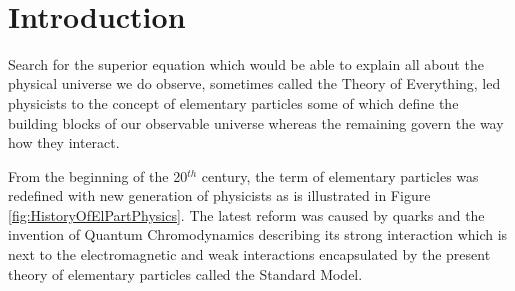 \documentclass[a4paper,11pt,twoside,openright]{book}
\begin{document}
\newpage 
\thispagestyle{empty}  
~

\clearpage
{}
\setcounter{page}{1}
\tableofcontents 

\clearpage
{}
\listoftables

\clearpage
{}
\listoffigures

\cleardoublepage

\clearpage
{}
\setcounter{page}{1}

\chapter*{Introduction}

Search for the superior equation which would be able to explain all about the
physical universe we do observe, sometimes called the Theory of Everything, led
physicists to the concept of elementary particles some of which define the
building blocks of our observable universe whereas the remaining govern the way how
they interact. 

From the beginning of the 20$^{th}$ century, the term of elementary particles
was redefined with new generation of physicists as is illustrated in Figure
\ref{fig:HistoryOfElPartPhysics}. The latest reform was caused by quarks and the
invention of Quantum Chromodynamics describing its strong interaction which is
next to the electromagnetic and weak interactions encapsulated by the present
theory of elementary particles called the Standard Model. 
\end{document}
